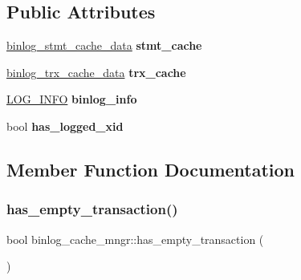 \subsection*{Public Attributes}
\begin{DoxyCompactItemize}
\item 
\mbox{\label{classbinlog__cache__mngr_af3be5f59a42845cc29b9723bc92de782}} 
\mbox{\hyperlink{classbinlog__stmt__cache__data}{binlog\+\_\+stmt\+\_\+cache\+\_\+data}} {\bfseries stmt\+\_\+cache}
\item 
\mbox{\label{classbinlog__cache__mngr_a8e3b5f9dc7aa26481d9cee7a9652c90a}} 
\mbox{\hyperlink{classbinlog__trx__cache__data}{binlog\+\_\+trx\+\_\+cache\+\_\+data}} {\bfseries trx\+\_\+cache}
\item 
\mbox{\label{classbinlog__cache__mngr_a4e8d04dfe9287d5d8d462a8cc8665d8d}} 
\mbox{\hyperlink{structst__log__info}{L\+O\+G\+\_\+\+I\+N\+FO}} {\bfseries binlog\+\_\+info}
\item 
\mbox{\label{classbinlog__cache__mngr_ad0e4a310eff8db655a42b98bf8afdc4e}} 
bool {\bfseries has\+\_\+logged\+\_\+xid}
\end{DoxyCompactItemize}


\subsection{Member Function Documentation}
\mbox{\label{classbinlog__cache__mngr_a2467716f5b8e405765df05d8240bf287}} 
\subsubsection{\texorpdfstring{has\+\_\+empty\+\_\+transaction()}{has\_empty\_transaction()}}
{\footnotesize\ttfamily bool binlog\+\_\+cache\+\_\+mngr\+::has\+\_\+empty\+\_\+transaction (\begin{DoxyParamCaption}{ }\end{DoxyParamCaption})\hspace{0.3cm}{\ttfamily [inline]}}

